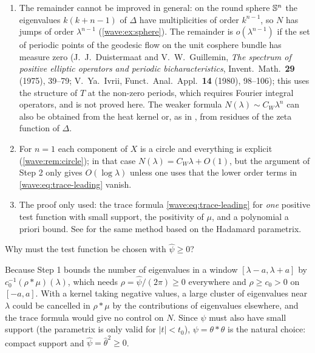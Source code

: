 \begin{remark}\label{wave:rem:weyl-sharp}
\begin{enumerate}[label=(\roman*)]
\item The remainder cannot be improved in general: on the round sphere
  $\mathbb{S}^n$ the eigenvalues $k(k+n-1)$ of $\Delta$ have multiplicities of order $k^{n-1}$,
  so $N$ has jumps of order $\lambda^{n-1}$ (\cref{wave:ex:sphere}). The remainder is
  $o(\lambda^{n-1})$ if the set of periodic points of the geodesic flow on the unit
  cosphere bundle has measure zero (J.~J.~Duistermaat and V.~W.~Guillemin, \emph{The
  spectrum of positive elliptic operators and periodic bicharacteristics}, Invent.\
  Math.\ \textbf{29} (1975), 39--79; V.~Ya.~Ivrii, Funct.\ Anal.\ Appl.\ \textbf{14}
  (1980), 98--106); this uses the structure of $T$ at the non-zero periods, which
  requires Fourier integral operators, and is not proved here. The weaker formula
  $N(\lambda)\sim C_W\lambda^n$ can also be obtained from the heat kernel or, as in
  \cite{Guillemin-Weyl}, from residues of the zeta function of $\Delta$.
\item For $n=1$ each component of $X$ is a circle and everything is explicit
  (\cref{wave:rem:circle}); in that case $N(\lambda)=C_W\lambda+O(1)$, but the argument of Step 2
  only gives $O(\log\lambda)$ unless one uses that the lower order terms in
  \eqref{wave:eq:trace-leading} vanish.
\item The proof only used: the trace formula \eqref{wave:eq:trace-leading} for
  \emph{one} positive test function with small support, the positivity of $\mu$, and a
  polynomial a priori bound. See \cite[Section~17.5]{Hormander-III} for the same
  method based on the Hadamard parametrix.
\end{enumerate}
\end{remark}

\begin{question}
Why must the test function be chosen with $\hat\psi\ge0$?
\end{question}
\begin{answer}
Because Step 1 bounds the number of eigenvalues in a window $[\lambda-a,\lambda+a]$ by
$c_0^{-1}(\rho*\mu)(\lambda)$, which needs $\rho=\hat\psi/(2\pi)\ge0$ everywhere and
$\rho\ge c_0>0$ on $[-a,a]$. With a kernel taking negative values, a large cluster of
eigenvalues near $\lambda$ could be cancelled in $\rho*\mu$ by the contributions of
eigenvalues elsewhere, and the trace formula would give no control on $N$. Since
$\psi$ must also have small support (the parametrix is only valid for $|t|<t_0$),
$\psi=\theta*\theta$ is the natural choice: compact support and $\hat\psi=\hat\theta^2\ge0$.
\end{answer}

